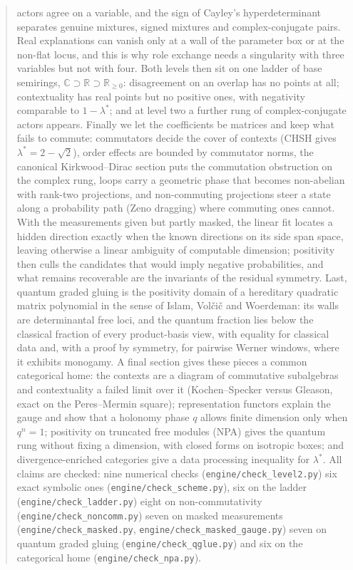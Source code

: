 \documentclass[11pt]{article}
\theoremstyle{definition}\newtheorem{definition}[theorem]{Definition}\newtheorem{remark}[theorem]{Remark}\newtheorem{example}[theorem]{Example}
\newcommand{\R}{\mathbb R}
\begin{document}
\begin{abstract}
actors agree on a variable, and the sign of Cayley's hyperdeterminant separates genuine mixtures, signed mixtures and complex-conjugate
pairs. Real explanations can vanish only at a wall of the parameter box or at the non-flat locus, and this is why role exchange needs a
singularity with three variables but not with four. Both levels then sit on one ladder of base semirings, $\mathbb C\supset\R\supset
\R_{\ge0}$: disagreement on an overlap has no points at all; contextuality has real points but no positive ones, with negativity comparable
to $1-\lambda^*$; and at level two a further rung of complex-conjugate actors appears. Finally we let the coefficients be matrices and
keep what fails to commute: commutators decide the cover of contexts (CHSH gives $\lambda^*=2-\sqrt2$), order effects are bounded by
commutator norms, the canonical Kirkwood--Dirac section puts the commutation obstruction on the complex rung, loops carry a geometric
phase that becomes non-abelian with rank-two projections, and non-commuting projections steer a state along a probability path (Zeno
dragging) where commuting ones cannot. With the measurements given but partly masked, the linear fit locates a hidden direction exactly
when the known directions on its side span space, leaving otherwise a linear ambiguity of computable dimension; positivity then culls the
candidates that would imply negative probabilities, and what remains recoverable are the invariants of the residual symmetry. Last, quantum
graded gluing is the positivity domain of a hereditary quadratic matrix polynomial in the sense of Islam, Volčič and Woerdeman: its walls are
determinantal free loci, and the quantum fraction lies below the classical fraction of every product-basis view, with equality for classical
data and, with a proof by symmetry, for pairwise Werner windows, where it exhibits monogamy. A final section gives these pieces a common categorical home: the contexts
are a diagram of commutative subalgebras and contextuality a failed limit over it (Kochen--Specker versus Gleason, exact on the Peres--Mermin
square); representation functors explain the gauge and show that a holonomy phase $q$ allows finite dimension only when $q^n=1$; positivity on
truncated free modules (NPA) gives the quantum rung without fixing a dimension, with closed forms on isotropic boxes; and divergence-enriched
categories give a data processing inequality for $\lambda^*$. All claims are checked: nine numerical checks (\texttt{engine/check\_level2.py})
six exact symbolic ones (\texttt{engine/check\_scheme.py}), six on the ladder
(\texttt{engine/check\_ladder.py}) eight on non-commutativity (\texttt{engine/check\_noncomm.py}) seven on masked measurements
(\texttt{engine/check\_masked.py}, \texttt{engine/check\_masked\_gauge.py}) seven on quantum graded gluing (\texttt{engine/check\_qglue.py}) and six on the categorical home (\texttt{engine/check\_npa.py}).
\end{abstract}
\end{document}
